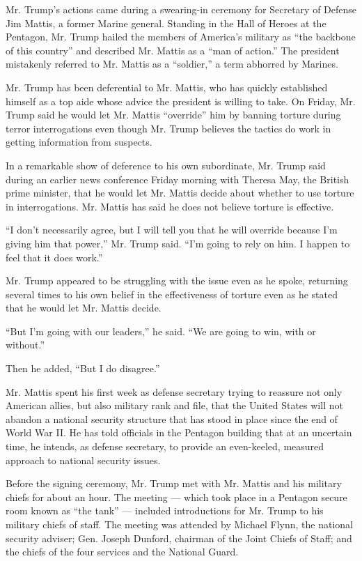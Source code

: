 Mr. Trump's actions came during a swearing-in ceremony for Secretary of
Defense Jim Mattis, a former Marine general. Standing in the Hall of
Heroes at the Pentagon, Mr. Trump hailed the members of America's
military as ``the backbone of this country'' and described Mr. Mattis as
a ``man of action.'' The president mistakenly referred to Mr. Mattis as
a ``soldier,'' a term abhorred by Marines.

Mr. Trump has been deferential to Mr. Mattis, who has quickly
established himself as a top aide whose advice the president is willing
to take. On Friday, Mr. Trump said he would let Mr. Mattis ``override''
him by banning torture during terror interrogations even though Mr.
Trump believes the tactics do work in getting information from suspects.

In a remarkable show of deference to his own subordinate, Mr. Trump said
during an earlier news conference Friday morning with Theresa May, the
British prime minister, that he would let Mr. Mattis decide about
whether to use torture in interrogations. Mr. Mattis has said he does
not believe torture is effective.

``I don't necessarily agree, but I will tell you that he will override
because I'm giving him that power,'' Mr. Trump said. ``I'm going to rely
on him. I happen to feel that it does work.''

Mr. Trump appeared to be struggling with the issue even as he spoke,
returning several times to his own belief in the effectiveness of
torture even as he stated that he would let Mr. Mattis decide.

``But I'm going with our leaders,'' he said. ``We are going to win, with
or without.''

Then he added, ``But I do disagree.''

Mr. Mattis spent his first week as defense secretary trying to reassure
not only American allies, but also military rank and file, that the
United States will not abandon a national security structure that has
stood in place since the end of World War II. He has told officials in
the Pentagon building that at an uncertain time, he intends, as defense
secretary, to provide an even-keeled, measured approach to national
security issues.

Before the signing ceremony, Mr. Trump met with Mr. Mattis and his
military chiefs for about an hour. The meeting --- which took place in a
Pentagon secure room known as ``the tank'' --- included introductions
for Mr. Trump to his military chiefs of staff. The meeting was attended
by Michael Flynn, the national security adviser; Gen. Joseph Dunford,
chairman of the Joint Chiefs of Staff; and the chiefs of the four
services and the National Guard.

